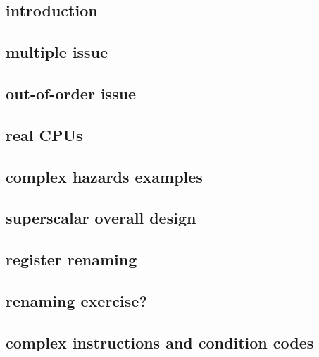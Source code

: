 \date{}
\title{}
\date{}

\begin{frame}
    \titlepage
\end{frame}



\usetikzlibrary{fit}

\subsection{introduction}

\subsection{multiple issue}


\subsection{out-of-order issue}


\subsection{real CPUs}


\subsection{complex hazards examples}

\subsection{superscalar overall design}


\subsection{register renaming}



\subsection{renaming exercise?}



\subsection{complex instructions and condition codes}


